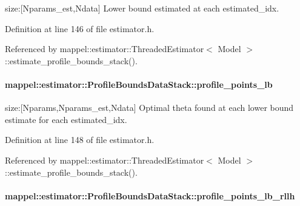 size\+:\mbox{[}Nparams\+\_\+est,Ndata\mbox{]} Lower bound estimated at each estimated\+\_\+idx. 



Definition at line 146 of file estimator.\+h.



Referenced by mappel\+::estimator\+::\+Threaded\+Estimator$<$ Model $>$\+::estimate\+\_\+profile\+\_\+bounds\+\_\+stack().

\paragraph[{\texorpdfstring{profile\+\_\+points\+\_\+lb}{profile_points_lb}}]{ mappel\+::estimator\+::\+Profile\+Bounds\+Data\+Stack\+::profile\+\_\+points\+\_\+lb}\hypertarget{structmappel_1_1estimator_1_1ProfileBoundsDataStack_ad5bd4f39d5046e582fe8be78567664af}{}\label{structmappel_1_1estimator_1_1ProfileBoundsDataStack_ad5bd4f39d5046e582fe8be78567664af}


size\+:\mbox{[}Nparams,Nparams\+\_\+est,Ndata\mbox{]} Optimal theta found at each lower bound estimate for each estimated\+\_\+idx. 



Definition at line 148 of file estimator.\+h.



Referenced by mappel\+::estimator\+::\+Threaded\+Estimator$<$ Model $>$\+::estimate\+\_\+profile\+\_\+bounds\+\_\+stack().

\paragraph[{\texorpdfstring{profile\+\_\+points\+\_\+lb\+\_\+rllh}{profile_points_lb_rllh}}]{ mappel\+::estimator\+::\+Profile\+Bounds\+Data\+Stack\+::profile\+\_\+points\+\_\+lb\+\_\+rllh}\hypertarget{structmappel_1_1estimator_1_1ProfileBoundsDataStack_a7d945ad7a7c73347babcde947b20515f}{}\label{structmappel_1_1estimator_1_1ProfileBoundsDataStack_a7d945ad7a7c73347babcde947b20515f}


